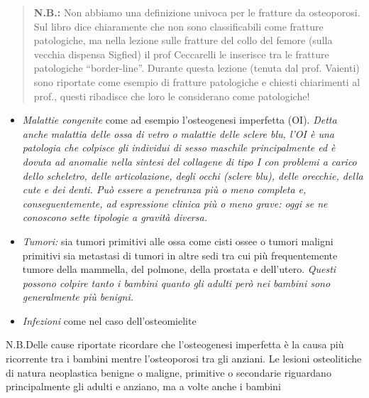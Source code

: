\documentclass[]{article}
\begin{document}
\begin{quote}
\textbf{N.B.:} Non abbiamo una definizione univoca per le fratture da
osteoporosi. Sul libro dice chiaramente che non sono classificabili come
fratture patologiche, ma nella lezione sulle fratture del collo del
femore (sulla vecchia dispensa Sigfied) il prof Ceccarelli le inserisce
tra le fratture patologiche ``border-line''. Durante questa lezione
(tenuta dal prof. Vaienti) sono riportate come esempio di fratture
patologiche e chiesti chiarimenti al prof., questi ribadisce che loro le
considerano come patologiche!
\end{quote}

\begin{itemize}
\item
  \emph{Malattie congenite} come ad esempio l'osteogenesi imperfetta
  (OI). \emph{Detta anche malattia delle ossa di vetro o malattie delle
  sclere blu, l'OI è una patologia che colpisce gli individui di sesso
  maschile principalmente ed è dovuta ad anomalie nella sintesi del
  collagene di tipo I con problemi a carico dello scheletro, delle
  articolazione, degli occhi (sclere blu), delle orecchie, della cute e
  dei denti. Può essere a penetranza più o meno completa e,
  conseguentemente, ad espressione clinica più o meno grave: oggi se ne
  conoscono sette tipologie a gravità diversa.}
\item
  \emph{Tumori:} sia tumori primitivi alle ossa come cisti ossee o
  tumori maligni primitivi sia metastasi di tumori in altre sedi tra cui
  più frequentemente tumore della mammella, del polmone, della prostata
  e dell'utero. \emph{Questi possono colpire tanto i bambini quanto gli
  adulti però nei bambini sono generalmente più benigni.}
\item
  \emph{Infezioni} come nel caso dell'osteomielite
\end{itemize}

N.B.Delle cause riportate ricordare che l'osteogenesi imperfetta è la
causa più ricorrente tra i bambini mentre l'osteoporosi tra gli anziani.
Le lesioni osteolitiche di natura neoplastica benigne o maligne,
primitive o secondarie riguardano principalmente gli adulti e anziano,
ma a volte anche i bambini
\end{document}
